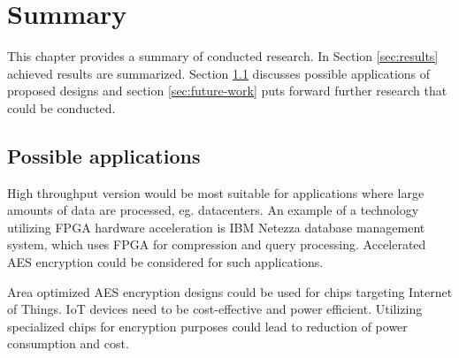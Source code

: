 \section{Summary}
This chapter provides a summary of conducted research. In Section \ref{sec:results} achieved results are summarized. Section \ref{sec:possible-applications} discusses possible applications of proposed designs and section \ref{sec:future-work} puts forward further research that could be conducted.







\subsection{Possible applications}
\label{sec:possible-applications}
High throughput version would be most suitable for applications where large amounts of data are processed, eg. datacenters. An example of a technology utilizing FPGA hardware acceleration is IBM Netezza \cite{netezzafast, francisco2011netezza} database management system, which uses FPGA for compression and query processing. Accelerated AES encryption could be considered for such applications.

Area optimized AES encryption designs could be used for chips targeting Internet of Things. IoT devices need to be cost-effective and power efficient. Utilizing specialized chips for encryption purposes could lead to reduction of power consumption and cost.


